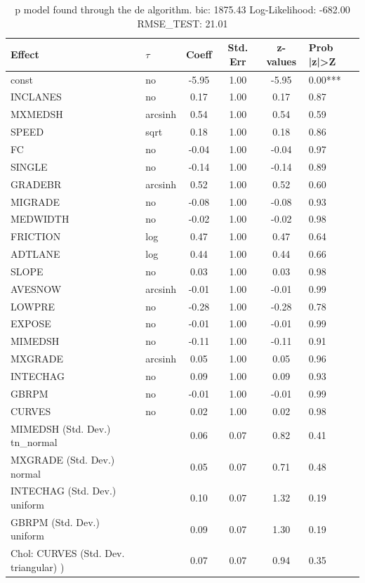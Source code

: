\begin{table}
	\caption{p model found through the de algorithm. bic: 1875.43 Log-Likelihood: -682.00 RMSE_TEST: 21.01}
	\begin{center}
		\begin{tabular}{|l|l|c|c|c|l|}
			\hline
			Effect & $\tau$ & Coeff & Std. Err & z-values & Prob |z|>Z \\
			\hline
			const & no & -5.95 & 1.00 & -5.95 & 0.00*** \\
			\hline
			INCLANES & no & 0.17 & 1.00 & 0.17 & 0.87 \\
			\hline
			MXMEDSH & arcsinh & 0.54 & 1.00 & 0.54 & 0.59 \\
			\hline
			SPEED & sqrt & 0.18 & 1.00 & 0.18 & 0.86 \\
			\hline
			FC & no & -0.04 & 1.00 & -0.04 & 0.97 \\
			\hline
			SINGLE & no & -0.14 & 1.00 & -0.14 & 0.89 \\
			\hline
			GRADEBR & arcsinh & 0.52 & 1.00 & 0.52 & 0.60 \\
			\hline
			MIGRADE & no & -0.08 & 1.00 & -0.08 & 0.93 \\
			\hline
			MEDWIDTH & no & -0.02 & 1.00 & -0.02 & 0.98 \\
			\hline
			FRICTION & log & 0.47 & 1.00 & 0.47 & 0.64 \\
			\hline
			ADTLANE & log & 0.44 & 1.00 & 0.44 & 0.66 \\
			\hline
			SLOPE & no & 0.03 & 1.00 & 0.03 & 0.98 \\
			\hline
			AVESNOW & arcsinh & -0.01 & 1.00 & -0.01 & 0.99 \\
			\hline
			LOWPRE & no & -0.28 & 1.00 & -0.28 & 0.78 \\
			\hline
			EXPOSE & no & -0.01 & 1.00 & -0.01 & 0.99 \\
			\hline
			MIMEDSH & no & -0.11 & 1.00 & -0.11 & 0.91 \\
			\hline
			MXGRADE & arcsinh & 0.05 & 1.00 & 0.05 & 0.96 \\
			\hline
			INTECHAG & no & 0.09 & 1.00 & 0.09 & 0.93 \\
			\hline
			GBRPM & no & -0.01 & 1.00 & -0.01 & 0.99 \\
			\hline
			CURVES & no & 0.02 & 1.00 & 0.02 & 0.98 \\
			\hline
			MIMEDSH (Std. Dev.) tn_normal &  & 0.06 & 0.07 & 0.82 & 0.41 \\
			\hline
			MXGRADE (Std. Dev.) normal &  & 0.05 & 0.07 & 0.71 & 0.48 \\
			\hline
			INTECHAG (Std. Dev.) uniform &  & 0.10 & 0.07 & 1.32 & 0.19 \\
			\hline
			GBRPM (Std. Dev.) uniform &  & 0.09 & 0.07 & 1.30 & 0.19 \\
			\hline
			 Chol: CURVES (Std. Dev. triangular) ) &  & 0.07 & 0.07 & 0.94 & 0.35 \\
			\hline
		\end{tabular}
	\end{center}
\end{table}